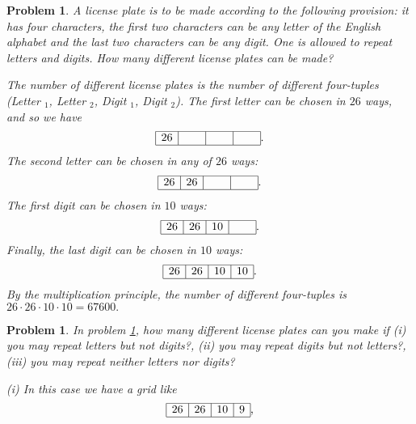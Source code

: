\documentclass[11pt, openany]{book}
\theoremstyle{change} \theoremheaderfont{\blue\sffamily\bfseries}
\newtheorem{pro}[thm]{Problem}
\theoremstyle{nonumberplain} \theoremheaderfont{\sffamily\bfseries}
\newcommand{\í}{\'{\i}}
\begin{document}
\begin{multicols}{2}
\begin{pro}\label{exa:prod_rule_1}
A license plate is to be made according to the following provision:
it has four characters, the first two characters can be any letter
of the English alphabet and the last two characters can be any
digit. One is allowed to repeat letters and digits. How many
different license plates can be made?
\begin{answer} The number of different license plates is the number of different
four-tuples (Letter $_1$, Letter $_2$, Digit $_1$, Digit $_2$). The
first letter can be chosen in $26$ ways, and so we have
$$\begin{array}{|c|c|c|c|}\hline 26 & \hspace{.5cm} & \hspace{.5cm} & \hspace{.5cm}    \\ \hline \end{array} . $$
The second letter can be chosen in any of $26$ ways:
$$\begin{array}{|c|c|c|c|}\hline 26 & 26 & \hspace{.5cm} & \hspace{.5cm}    \\ \hline \end{array} . $$
The first digit can be chosen in $10$ ways:
$$\begin{array}{|c|c|c|c|}\hline 26 & 26 & 10 & \hspace{.5cm}    \\ \hline \end{array} . $$
Finally, the last digit can be chosen in $10$ ways:
$$\begin{array}{|c|c|c|c|}\hline 26 & 26 & 10 & 10    \\ \hline \end{array} . $$
By the multiplication principle, the number of different four-tuples
is $26\cdot 26\cdot 10 \cdot 10 = 67600.$
\end{answer}
\end{pro}
\begin{pro}
In problem \ref{exa:prod_rule_1}, how many different license plates
can you make if (i) you may repeat letters but not digits?, (ii) you
may repeat digits but not letters?, (iii) you may  repeat neither
letters nor digits? \begin{answer} (i) In this case we have a grid
like
$$\begin{array}{|c|c|c|c|}\hline 26 & 26 & 10 & 9    \\ \hline \end{array} , $$

\end{answer}
\end{pro}
\end{multicols}
\end{document}
